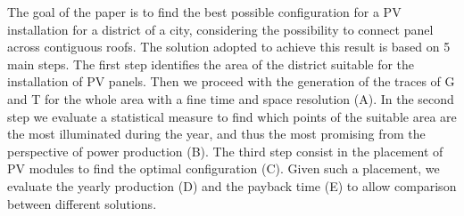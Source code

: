





The goal of the paper is to find the best possible configuration for a PV installation for a district of a city, considering the possibility to connect panel across contiguous roofs. The solution adopted to achieve this result is based on 5 main steps. %
The first step identifies the area of the district suitable for the installation of PV panels. Then we proceed with the generation of the traces of G and T for the whole area with a fine time and space resolution (A). In the second step we evaluate a statistical measure to find which points of the suitable area are the most illuminated during the year, and thus the most promising from the perspective of power production (B). The third step consist in the placement of PV modules to find the optimal configuration (C). Given such a placement,  we evaluate the yearly production (D) and the payback time (E) to allow comparison between different solutions.

